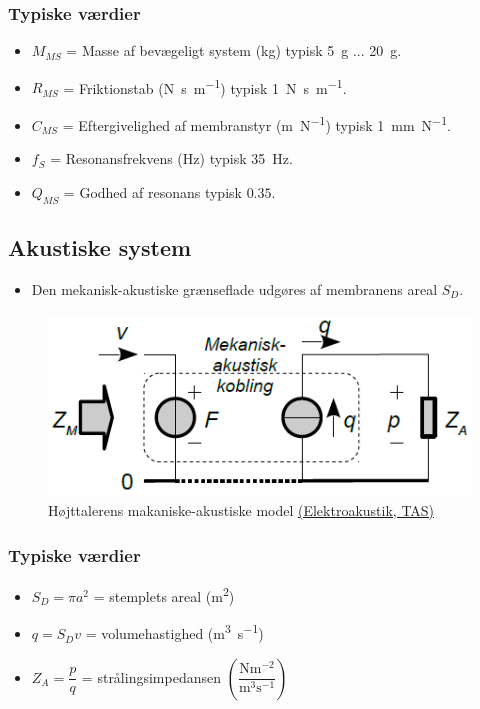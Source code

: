 \subsubsection{Typiske værdier}
\begin{itemize}
	\item $M_{MS}$ = Masse af bevægeligt system (\si{\kilogram}) typisk \SI{5}{\gram} ... \SI{20}{\gram}.
	\item $R_{MS}$ = Friktionstab (\si{\newton\second\per\meter}) typisk \SI{1}{\newton\second\per\meter}.
	\item $C_{MS}$ = Eftergivelighed af membranstyr (\si{\meter\per\newton}) typisk \SI{1}{\milli\meter\per\newton}.
	\item $f_S$ = Resonansfrekvens (\si{\hertz}) typisk \SI{35}{\hertz}.
	\item $Q_{MS}$ = Godhed af resonans typisk $0.35$.
\end{itemize}

\subsection{Akustiske system}
\begin{itemize}
	\item Den mekanisk-akustiske grænseflade udgøres af membranens areal $S_D$.
\end{itemize}

\begin{figure} [H]
	\centering
	\includegraphics[width=0.65\linewidth]{graphics/25.png}
	\caption{Højttalerens makaniske-akustiske model \href{http://www.torean.dk/artikel/Elektroakustik.pdf}{(Elektroakustik, TAS)}}
	\label{fig:25}
\end{figure}


\subsubsection{Typiske værdier}
\begin{itemize}
	\item $S_D = \pi a^2$ = stemplets areal (\si{\square\meter})
	\item $q = S_Dv$ = volumehastighed (\si{\cubic\meter\per\second})
	\item $Z_A = \dfrac{p}{q}$ = strålingsimpedansen $\left(\dfrac{\si{\newton\meter^{-2}}}{\si{\cubic\meter\second^{-1}}}\right)$
\end{itemize}

